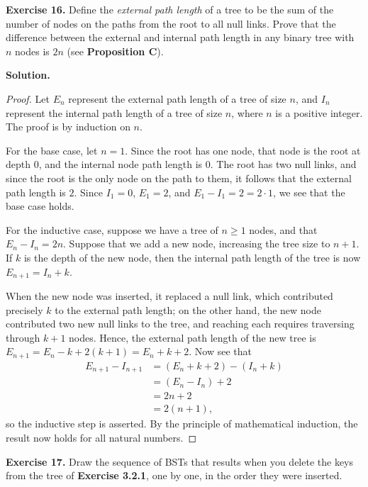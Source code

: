\documentclass[12pt, a4paper]{article}
\newenvironment{ex}[2][Exercise]
{\par\medskip\noindent \textbf{#1 #2.}}
{\medskip}
\newenvironment{sol}[1][Solution]
{\par\medskip\noindent \textbf{#1.} }
{\medskip}
\begin{document}
	\begin{ex}{16}
		Define the \emph{external path length} of a tree to be the sum of the number of
		nodes on the paths from the root to all null links. Prove that the difference between
		the external and internal path length in any binary tree with $n$ nodes is $2n$
		(see \textbf{Proposition C}).
	\end{ex}
	\begin{sol}
		\begin{proof}
			Let $E_n$ represent the external path length of a tree of size $n$,
			and $I_n$ represent the internal path length of a tree of size $n$,
			where $n$ is a positive integer. The proof is by induction on $n$.
			
			For the base case, let $n=1$. Since the root has one node, that node
			is the root at depth $0$, and the internal node path length is $0$.
			The root has two null links, and since the root is the only node on
			the path to them, it follows that the external path length is $2$.
			Since $I_1=0$, $E_1=2$, and $E_1-I_1=2=2\cdot 1$, we see that the base
			case holds.
			
			For the inductive case, suppose we have a tree of $n\geq 1$ nodes,
			and that $E_n-I_n=2n$. Suppose that we add a new node, increasing
			the tree size to $n+1$. If $k$ is the depth of the new node, then
			the internal path length of the tree is now $E_{n+1}=I_n+k$.
			
			When the new node was inserted, it replaced a null link, which contributed precisely
			$k$ to the external path length; on the other hand, the new node
			contributed two new null links to the tree, and reaching each requires
			traversing through $k+1$ nodes. Hence, the external path length
			of the new tree is $E_{n+1}=E_n-k+2(k+1)=E_n+k+2$. Now see that
			\begin{align*}
				E_{n+1}-I_{n+1}&=(E_n+k+2)-(I_n+k)\\
				&=(E_n-I_n)+2\\
				&=2n+2\\
				&=2(n+1),
			\end{align*}
			so the inductive step is asserted. By the principle of mathematical induction,
			the result now holds for all natural numbers.
		\end{proof}
	\end{sol}
	\begin{ex}{17}
		Draw the sequence of BSTs that results when you delete the keys from the tree of
		\textbf{Exercise 3.2.1}, one by one, in the order they were inserted.
	\end{ex}
\end{document}
